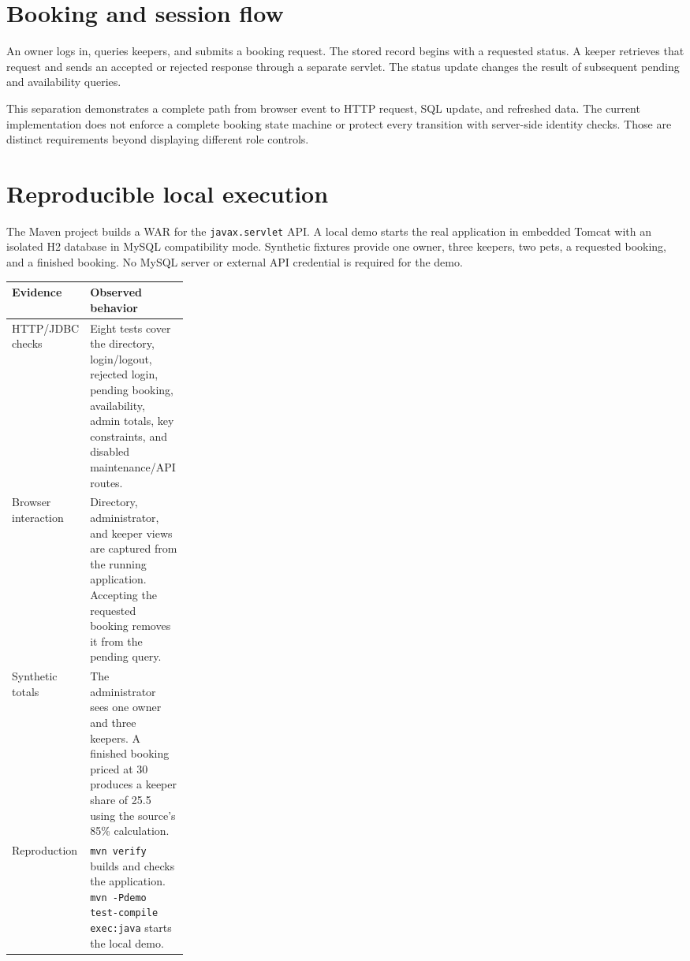 \documentclass[10pt,a4paper]{article}
\begin{document}
\newpage
\section*{Booking and session flow}
An owner logs in, queries keepers, and submits a booking request. The stored record begins with a requested status. A keeper retrieves that request and sends an accepted or rejected response through a separate servlet. The status update changes the result of subsequent pending and availability queries.

This separation demonstrates a complete path from browser event to HTTP request, SQL update, and refreshed data. The current implementation does not enforce a complete booking state machine or protect every transition with server-side identity checks. Those are distinct requirements beyond displaying different role controls.

\section*{Reproducible local execution}
The Maven project builds a WAR for the \texttt{javax.servlet} API. A local demo starts the real application in embedded Tomcat with an isolated H2 database in MySQL compatibility mode. Synthetic fixtures provide one owner, three keepers, two pets, a requested booking, and a finished booking. No MySQL server or external API credential is required for the demo.

\renewcommand{\arraystretch}{1.25}
\begin{tabularx}{\linewidth}{@{}p{0.26\linewidth}X@{}}
\toprule
Evidence & Observed behavior \\
\midrule
HTTP/JDBC checks & Eight tests cover the directory, login/logout, rejected login, pending booking, availability, admin totals, key constraints, and disabled maintenance/API routes. \\
Browser interaction & Directory, administrator, and keeper views are captured from the running application. Accepting the requested booking removes it from the pending query. \\
Synthetic totals & The administrator sees one owner and three keepers. A finished booking priced at 30 produces a keeper share of 25.5 using the source's 85\% calculation. \\
Reproduction & \texttt{mvn verify} builds and checks the application. \texttt{mvn -Pdemo test-compile exec:java} starts the local demo. \\
\bottomrule
\end{tabularx}
\end{document}
